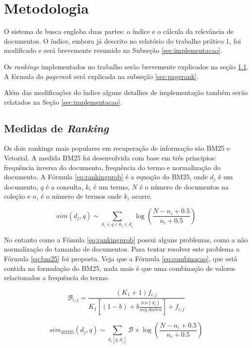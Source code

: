 \documentclass[a4paper]{article}
\begin{document}
\section{Metodologia}

O sistema de busca engloba duas partes: o índice e 
o cálcula da relevância de documentos. O índice, embora já descrito no 
relatório do trabalho prático 1, foi modificado e será brevemente 
resumido na Subseção \ref{sec:implementacao}.

Os \emph{rankings} implementados no trabalho serão brevemente explicados 
na seção \ref{sec:ranking}. A fórmula do \emph{pagerank} será explicada 
na subseção \ref{sec:pagerank}.

Além das modificações do índice alguns detalhes de implementação também serão 
relatados na Seção \ref{sec:implementacao}.

\subsection{Medidas de \emph{Ranking}}\label{sec:ranking}

Os dois rankings mais populares em recuperação de informação são BM25 e Vetorial. 
A medida BM25 foi desenvolvida com base em três principios: frequência inversa 
do documento, frequência do termo e normalização do documento. A  Fórmula \ref{eq:rankingprob} é 
a equação do BM25, onde  $d_j$ é um documento, $q$ é a consulta, $k_i$ é um termo, 
$N$ é o número de documentos na coleção e $n_i$ é o número de termos onde 
$k_i$ ocorre.


\begin{equation}
    sim(d_j,q) \sim \sum_{k_i \in q \wedge k_i \in d_j} \log{\left(\frac{N-n_i+0.5}{n_i+0.5}\right)}
    \label{eq:rankingprob}
\end{equation}

No entanto como a Fómula \ref{eq:rankingprob} possui alguns problemas, como 
a não normalização do tamanho de documentos. Para tentar resolver este problema 
a Fórmula \ref{eq:bm25} foi proposta. Veja que 
a Fórmula \ref{eq:combinacao}, que está contida na formulação do BM25, nada mais é 
que uma combinação de valores relacionados a frequência do termo.

\begin{equation}
    \mathcal{B}_{i,j} = \frac{(K_1 +1)f_{i,j}}{K_1 \left[ (1-b) + b\frac{len(d_j)}{avg\_doclen}\right] + f_{i,j}}
    \label{eq:combinacao}
\end{equation}

\begin{equation}
    sim_{BM25}(d_j,q) \sim \sum_{k_i[q,d_j]} \mathcal{B} \times \log{\left(\frac{N-n_i+0.5}{n_i+0.5}\right)}
    \label{eq:bm25}
\end{equation}
\end{document}
